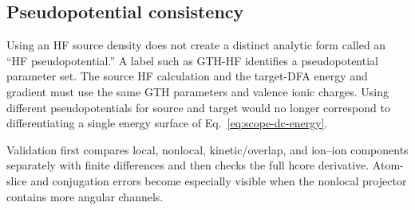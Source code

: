 \subsection{Pseudopotential consistency}

Using an HF source density does not create a distinct analytic form called an
``HF pseudopotential.''  A label such as GTH-HF identifies a pseudopotential
parameter set.  The source HF calculation and the target-DFA energy and
gradient must use the same GTH parameters and valence ionic charges.  Using
different pseudopotentials for source and target would no longer correspond to
differentiating a single energy surface of Eq.~\eqref{eq:scope-dc-energy}.

Validation first compares local, nonlocal, kinetic/overlap, and ion--ion
components separately with finite differences and then checks the full hcore
derivative.  Atom-slice and conjugation errors become especially visible when
the nonlocal projector contains more angular channels.
